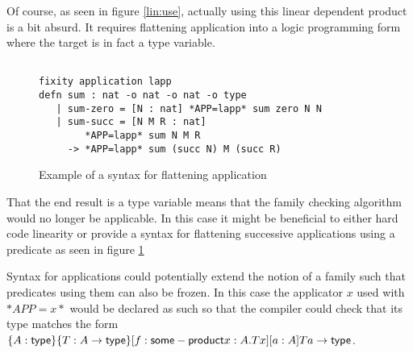 Of course, as seen in figure \ref{lin:use}, actually using this linear dependent product is a bit
absurd.  It requires flattening application into a logic programming form where the target
is in fact a type variable.



\begin{figure}[H]
\begin{lstlisting}

fixity application lapp
defn sum : nat -o nat -o nat -o type
   | sum-zero = [N : nat] *APP=lapp* sum zero N N
   | sum-succ = [N M R : nat] 
        *APP=lapp* sum N M R 
     -> *APP=lapp* sum (succ N) M (succ R)
\end{lstlisting}
\caption{Example of a syntax for flattening application}
\label{lin:flat}
\end{figure}


That the end result is a type variable means that the family checking algorithm
would no longer be applicable. In this case it might be beneficial to either hard code
linearity or provide a syntax for flattening successive applications using a predicate as
seen in figure \ref{lin:flat}

Syntax for applications could potentially extend the notion of a family such that
predicates using them can also be frozen. In this case the applicator $x$ used with 
$*APP = x*$ would be declared as such so that the compiler could check that its type matches the form $\{ A : \mathsf{type} \}\{ T : A \rightarrow \mathsf{type} \}[f : \mathsf{some}-\mathsf{product} x : A . T x] [ a : A] T a \rightarrow \mathsf{type}$.
